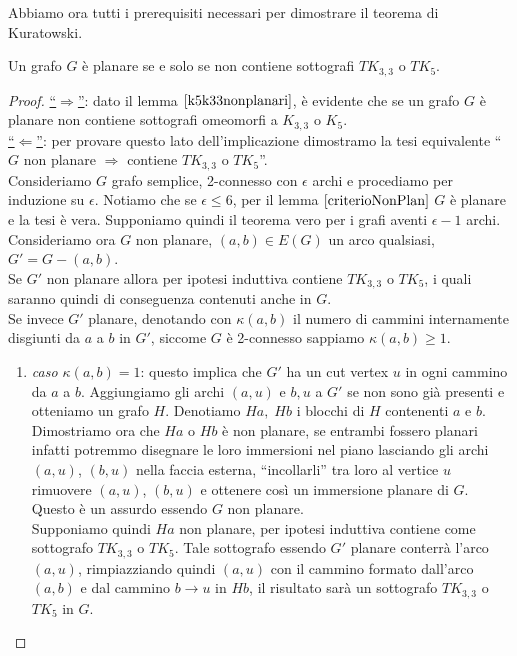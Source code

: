 Abbiamo ora tutti i prerequisiti necessari per dimostrare il teorema di Kuratowski.
\begin{teorema}\label{Kuratowski}
    Un grafo \(G\) è planare se e solo se non contiene sottografi \(TK_{3,3}\) o \(TK_5\).
    \begin{proof}
        \underline{“\(\Rightarrow\)”}: dato il lemma \(\ref{k5k33nonplanari}\), è evidente che se un grafo \(G\) è planare non contiene sottografi omeomorfi a \(K_{3,3}\) o \(K_5\). \smallskip \\
        \underline{“\(\Leftarrow\)”}: per provare questo lato dell'implicazione dimostramo la tesi equivalente “\(G\) non planare \(\Rightarrow\) contiene \(TK_{3,3}\) o \(TK_5\)”.\\
        Consideriamo \(G\) grafo semplice, 2-connesso con \(\epsilon\) archi e procediamo per induzione su \(\epsilon\). Notiamo che se \(\epsilon \leq 6\), per il lemma \(\ref{criterioNonPlan}\) \(G\) è planare e la tesi è vera. Supponiamo quindi il teorema vero per i grafi aventi \(\epsilon-1\) archi.\\
        Consideriamo ora \(G\) non planare, \((a,b) \in E(G)\) un arco qualsiasi, \(G'=G-(a,b)\). \\
        Se \(G'\) non planare allora per ipotesi induttiva contiene \(TK_{3,3}\) o \(TK_5\), i quali saranno quindi di conseguenza contenuti anche in \(G\). \\
        Se invece \(G'\) planare, denotando con \(\kappa(a,b)\) il numero di cammini internamente disgiunti da \(a\) a \(b\) in \(G'\), siccome \(G\) è 2-connesso sappiamo \(\kappa(a,b)\geq 1\).
        \begin{enumerate}
            \item \textit{caso \(\kappa(a,b)=1\)}: questo implica che \(G'\) ha un cut vertex \(u\) in ogni cammino da \(a\) a \(b\). Aggiungiamo gli archi \((a,u)\) e \(b,u\) a \(G'\) se non sono già presenti e otteniamo un grafo \(H\). Denotiamo \(Ha,\; Hb\) i blocchi di \(H\) contenenti \(a\) e \(b\).
            \\ Dimostriamo ora che \(Ha\) o \(Hb\) è non planare, se entrambi fossero planari infatti potremmo disegnare le loro immersioni nel piano lasciando gli archi \((a,u)\), \((b,u)\) nella faccia esterna, “incollarli” tra loro al vertice \(u\) rimuovere  \((a,u)\), \((b,u)\) e ottenere così un immersione planare di \(G\). Questo è un assurdo essendo \(G\) non planare.\\
            Supponiamo quindi \(Ha\) non planare, per ipotesi induttiva contiene come sottografo \(TK_{3,3}\) o \(TK_5\). Tale sottografo essendo \(G'\) planare conterrà l'arco \((a,u)\), rimpiazziando quindi \((a,u)\) con il cammino formato dall'arco \((a,b)\) e dal cammino \(b \to u\) in \(Hb\), il risultato sarà un sottografo \(TK_{3,3}\) o \(TK_5\) in \(G\).

\end{enumerate}
\end{proof}
\end{teorema}
